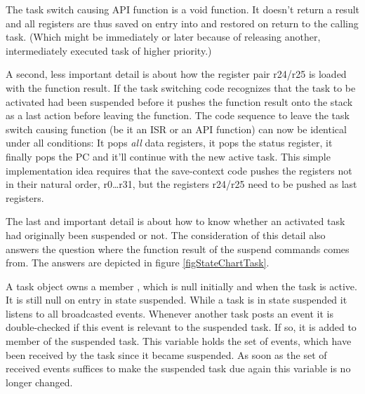 
The task switch causing API function  is a void
function. It doesn't return a result and all registers are thus saved on
entry into  and restored on return to the calling
task. (Which might be immediately or later because of releasing another,
intermediately executed task of higher priority.)

A second, less important detail is about how the register pair r24/r25 is
loaded with the function result. If the task switching code recognizes
that the task to be activated had been suspended before it pushes the
function result onto the stack as a last action before leaving the
function. The code sequence to leave the task switch causing function (be
it an ISR or an API function) can now be identical under all conditions: It
pops \emph{all} data registers, it pops the status register, it finally
pops the PC and it'll continue with the new active task. This simple
implementation idea requires that the save-context code pushes the
registers not in their natural order, r0\ldots r31, but the registers
r24/r25 need to be pushed as last registers.

The last and important detail is about how to know whether an activated
task had originally been suspended or not. The consideration of this
detail also answers the question where the function result of the suspend
commands comes from. The answers are depicted in figure
\ref{figStateChartTask}.


A task object owns a member , which is null
initially and when the task is active. It is still null on entry in state
suspended. While a task is in state suspended it listens to all
broadcasted events. Whenever another task posts an event it is
double-checked if this event is relevant to the suspended task. If so, it
is added to member  of the suspended task. This
variable holds the set of events, which have been received by the task
since it became suspended. As soon as the set of received events suffices
to make the suspended task due again this variable is no longer changed.

